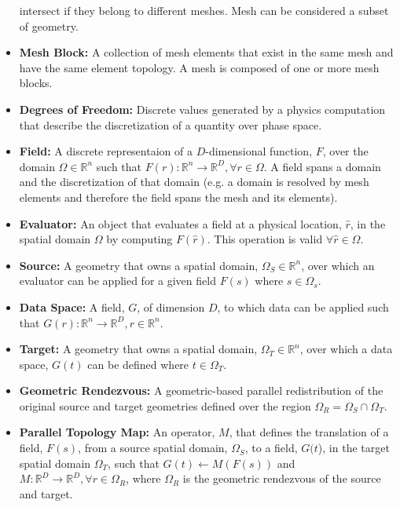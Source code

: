 \documentclass[letterpaper,12pt]{article}
\begin{document}
\begin{itemize}
  intersect if they belong to different meshes. Mesh can be considered
  a subset of geometry.
\item {\bf Mesh Block:} A collection of mesh elements that exist in
  the same mesh and have the same element topology.  A mesh is 
  composed of one or more mesh blocks.
\item {\bf Degrees of Freedom:} Discrete values generated by a physics
  computation that describe the discretization of a quantity over
  phase space.
\item {\bf Field:} A discrete representaion of a $D$-dimensional
  function, $F$, over the domain $\Omega \in \mathbb{R}^n$ such that
  $F(r) : \mathbb{R}^n \rightarrow \mathbb{R}^D, \forall r \in
  \Omega$. A field spans a domain and the discretization of that
  domain (e.g. a domain is resolved by mesh elements and therefore the
  field spans the mesh and its elements).
\item {\bf Evaluator:} An object that evaluates a field at a physical
  location, $\hat{r}$, in the spatial domain $\Omega$ by computing
  $F(\hat{r})$. This operation is valid $\forall \hat{r} \in \Omega$.
\item {\bf Source:} A geometry that owns a spatial domain, $\Omega_S
  \in \mathbb{R}^n$, over which an evaluator can be applied for a
  given field $F(s)$ where $s \in \Omega_s$.
\item {\bf Data Space:} A field, $G$, of dimension $D$, to which data
  can be applied such that $G(r) : \mathbb{R}^n \rightarrow
  \mathbb{R}^D, r \in \mathbb{R}^n$.
\item {\bf Target:} A geometry that owns a spatial domain, $\Omega_T
  \in \mathbb{R}^n$, over which a data space, $G(t)$ can be defined
  where $t \in \Omega_T$.
\item{\bf Geometric Rendezvous:} A geometric-based parallel
  redistribution of the original source and target geometries defined
  over the region $\Omega_R = \Omega_S \cap \Omega_T$.
\item{\bf Parallel Topology Map:} An operator, $M$, that defines the
  translation of a field, $F(s)$, from a source spatial domain,
  $\Omega_S$, to a field, $G(t$), in the target spatial domain
  $\Omega_T$, such that $G(t)\leftarrow M(F(s))$ and $M: \mathbb{R}^D
  \rightarrow \mathbb{R}^D, \forall r \in \Omega_R$, where $\Omega_R$
  is the geometric rendezvous of the source and target.
\end{itemize}

\clearpage

\end{document}
